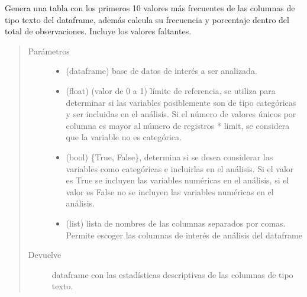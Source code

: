 \documentclass[letterpaper,10pt,openany,spanish]{sphinxmanual}
\begin{document}
\begin{fulllineitems}
\label{\detokenize{datos:datos.categorias}}
Genera una tabla con los primeros 10 valores más frecuentes de las columnas de tipo texto del dataframe, además calcula su frecuencia y porcentaje dentro del total de observaciones. Incluye los valores faltantes.
\begin{quote}\begin{description}
\item[{Parámetros}] \leavevmode\begin{itemize}
\item {} 
 \textendash{} (dataframe) base de datos de interés a ser analizada.

\item {} 
 \textendash{} (float) (valor de 0 a 1) límite de referencia, se utiliza para determinar si las variables posiblemente son de tipo categóricas y ser incluidas en el análisis. Si el número de valores únicos por columna es mayor al número de registros * limit, se considera que la variable no es categórica.

\item {} 
 \textendash{} (bool) \{True, False\}, determina si se desea considerar las variables como categóricas e incluirlas en el análisis. Si el valor es True se incluyen las variables numéricas en el análisis, si el valor es False no se incluyen las variables numéricas en el análisis.

\item {} 
 \textendash{} (list) lista de nombres de las columnas separados por comas. Permite escoger las columnas de interés de análisis del dataframe

\end{itemize}

\item[{Devuelve}] \leavevmode
dataframe con las estadísticas descriptivas de las columnas de tipo texto.

\end{description}\end{quote}

\end{fulllineitems}
\end{document}
